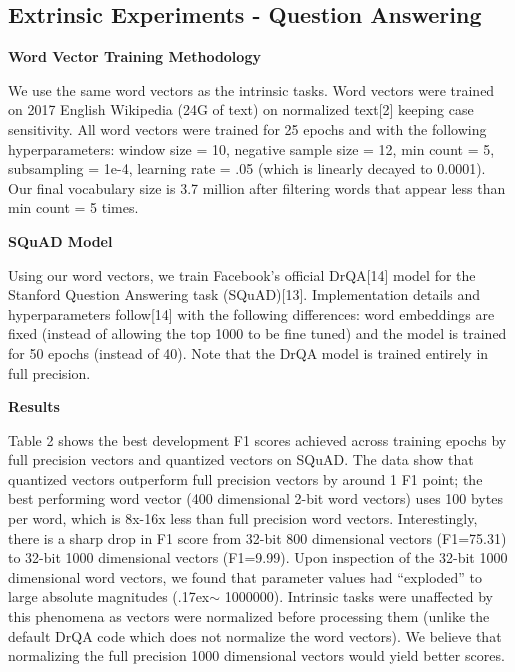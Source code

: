 \documentclass{article} %
\begin{document}
\subsection{Extrinsic Experiments - Question Answering}

\textbf{Word Vector Training Methodology}

We use the same word vectors as the intrinsic tasks. Word vectors were
trained on 2017 English Wikipedia (24G of text) on normalized text[2]
keeping case sensitivity. All word vectors were trained for 25 epochs
and with the following hyperparameters: window size = 10, negative
sample size = 12, min count = 5, subsampling = 1e-4, learning rate =
.05 (which is linearly decayed to 0.0001). Our final vocabulary size
is 3.7 million after filtering words that appear less than min count =
5 times.

\textbf{SQuAD Model}

Using our word vectors, we train Facebook's official DrQA[14] model
for the Stanford Question Answering task (SQuAD)[13]. Implementation
details and hyperparameters follow[14] with the following differences:
word embeddings are fixed (instead of allowing the top 1000 to be fine
tuned) and the model is trained for 50 epochs (instead of 40). Note
that the DrQA model is trained entirely in full precision.

\textbf{Results}

Table 2 shows the best development F1 scores achieved across training
epochs by full precision vectors and quantized vectors on SQuAD. The
data show that quantized vectors outperform full precision vectors by
around 1 F1 point; the best performing word vector (400 dimensional
2-bit word vectors) uses 100 bytes per word, which is 8x-16x less than
full precision word vectors. Interestingly, there is a sharp drop in
F1 score from 32-bit 800 dimensional vectors (F1=75.31) to 32-bit 1000
dimensional vectors (F1=9.99). Upon inspection of the 32-bit 1000
dimensional word vectors, we found that parameter values had
``exploded'' to large absolute magnitudes
({\raise.17ex\hbox{$\scriptstyle\mathtt{\sim}$}} 1000000). Intrinsic
tasks were unaffected by this phenomena as vectors were normalized
before processing them (unlike the default DrQA code which does not
normalize the word vectors). We believe that normalizing the full
precision 1000 dimensional vectors would yield better scores.
\end{document}

